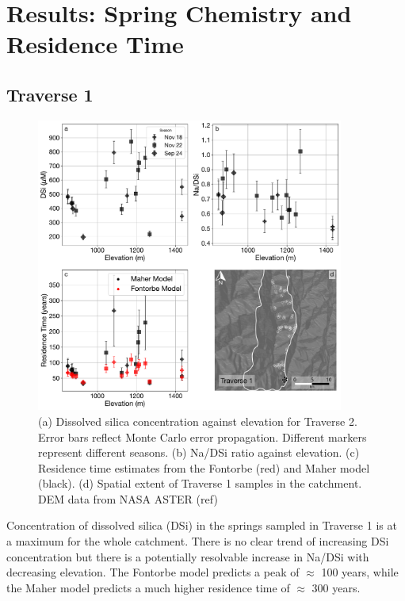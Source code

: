 
\section{Results: Spring Chemistry and Residence Time}

\subsection{Traverse 1}

\begin{figure}[h]
    \centering
        \includegraphics[width=0.9\textwidth]{Traverse_1_summary.pdf}
    \caption{(a) Dissolved silica concentration against elevation for Traverse 2. Error bars reflect Monte Carlo error propagation. Different markers represent different seasons. (b) Na/DSi ratio against elevation. (c) Residence time estimates from the Fontorbe (red) and Maher model (black). (d) Spatial extent of Traverse 1 samples in the catchment. DEM data from NASA ASTER (ref)}
    \label{fig:trav1}
\end{figure}

\FloatBarrier

Concentration of dissolved silica (DSi) in the springs sampled in Traverse 1 is at a maximum for the whole catchment. There is no clear trend of increasing DSi concentration but there is a potentially resolvable increase in Na/DSi with decreasing elevation. The Fontorbe model predicts a peak of $\approx$ 100 years, while the Maher model predicts a much higher residence time of $\approx$ 300 years. 




